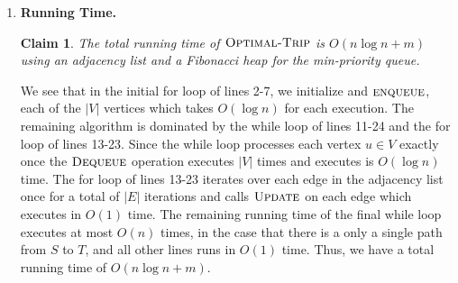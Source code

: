 \documentclass[11pt]{article}
\newtheorem{claim}[theorem]{Claim}
\theoremstyle{nonumberplain}
\newtheorem{proof}{Proof}
\begin{document}
\begin{enumerate}
\begin{proof}
\begin{enumerate}
    \\
    \textbf{Case 3.} If neither case 1 nor case 2 are satisfied, we do not update the vertex $v$ because $v.stops=\delta(S,v)$.\\
    \\
    Observe that cases 2 and 3 are the same as Dijkstra's algorithm for $\delta(S,v)$ and case 1 is similar to case 2 but controls for our constraint $t$. As a result, our modifications to the while loop do not change the behavior of Dijkstra's algorithm. Thus, the correctness of Dijkstra's algorithm applies to $\proc{Optimal-Trip}$ as well.
    \item Having shown that at termination the attribute $u.\pi$ of each vertex $u \in V$ stores the predecessor vertex on the optimal shortest path $\delta(S,v)$, it is clear that iterating through the predecessor vertices from $T$ to $S$ we have the optimal shortest path in reverse order but by storing each predecessor vertex from $T$ to in the front of a linked list, when the list is output, we have the shortest path $\delta(S,T)$ in order from $S$ to $T$, not including $S$. 
\end{enumerate}
\end{proof}
\item \textbf{Running Time.} %
\begin{claim}
The total running time of $\proc{Optimal-Trip}$ is $O(n \log n+m)$ using an adjacency list and a Fibonacci heap for the min-priority queue.
\end{claim}
We see that in the initial for loop of lines 2-7, we initialize and $\textnormal{\scshape enqueue}$, each of the $|V|$ vertices which takes $O(\log n)$ for each execution. The remaining algorithm is dominated by the while loop of lines 11-24 and the for loop of lines 13-23. Since the while loop processes each vertex $u \in V$ exactly once the $\textnormal{\scshape Dequeue}$ operation executes $|V|$ times and executes is $O(\log n)$ time. The for loop of lines 13-23 iterates over each edge in the adjacency list once for a total of $|E|$ iterations and calls $\textnormal{\scshape Update}$ on each edge which executes in $O(1)$ time. The remaining running time of the final while loop executes at most $O(n)$ times, in the case that there is a only a single path from $S$ to $T$, and all other lines runs in $O(1)$ time. Thus, we have a total running time of $O(n \log n+m)$.
\end{enumerate}
\end{document}
